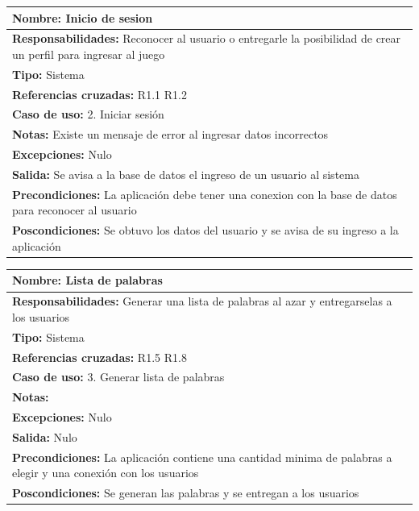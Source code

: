 \begin{table}[H]
    \begin{center}
        \begin{tabular}{|m{15cm} |}         
        	\hline 
        	\textbf{Nombre:} Inicio de sesion \\
        	\hline
        	\textbf{Responsabilidades:} Reconocer al usuario o entregarle la posibilidad de crear un perfil para ingresar al juego\\
        	\hline
        	\textbf{Tipo:} Sistema \\
        	\hline
        	\textbf{Referencias cruzadas:} R1.1 R1.2\\
        	\hline
        	\textbf{Caso de uso:} 2. Iniciar sesión\\
        	\hline
        	\textbf{Notas:} Existe un mensaje de error al ingresar datos incorrectos\\
        	\hline
        	\textbf{Excepciones:} Nulo\\
        	\hline
        	\textbf{Salida:} Se avisa a la base de datos el ingreso de un usuario al sistema\\
        	\hline
        	\textbf{Precondiciones:} La aplicación debe tener una conexion con la base de datos para reconocer al usuario \\
        	\hline
        	\textbf{Poscondiciones:} Se obtuvo los datos del usuario y se avisa de su ingreso a la aplicación\\
        	\hline
        \end{tabular}
    \end{center}
\end{table}

\begin{table}[H]
    \begin{center}
        \begin{tabular}{| m{15cm} |}            
        	\hline 
        	\textbf{Nombre:} Lista de palabras \\
        	\hline
        	\textbf{Responsabilidades:} Generar una lista de palabras al azar y entregarselas a los usuarios\\
        	\hline
        	\textbf{Tipo:} Sistema\\
        	\hline
        	\textbf{Referencias cruzadas:} R1.5 R1.8\\
        	\hline
        	\textbf{Caso de uso:} 3. Generar lista de palabras\\
        	\hline
        	\textbf{Notas:} \\
        	\hline
        	\textbf{Excepciones:} Nulo \\
        	\hline
        	\textbf{Salida:} Nulo\\
        	\hline
        	\textbf{Precondiciones:} La aplicación contiene una cantidad minima de palabras a elegir y una conexión con los usuarios\\
        	\hline
        	\textbf{Poscondiciones:} Se generan las palabras y se entregan a los usuarios\\
        	\hline
        \end{tabular}
    \end{center}
\end{table}

